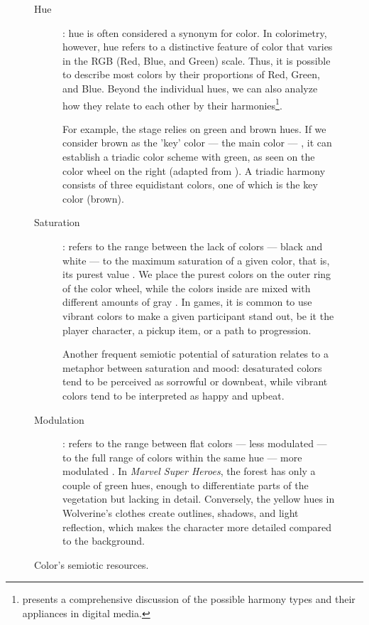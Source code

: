 \documentclass[english]{textolivre}
\begin{document}
\begin{figure}[htbp]
\begin{minipage}[t]{0.47\textwidth}
\label{fig2b}
\end{minipage}
\caption{Color’s semiotic resources.}
\label{chart1}
\begin{minipage}[t]{\textwidth}
\small
\vspace{2ex}
\begin{description}
    \item[Hue]: hue is often considered a synonym for color. In colorimetry, however, hue refers to a distinctive feature of color that varies in the RGB (Red, Blue, and Green) scale. Thus, it is possible to describe most colors by their proportions of Red, Green, and Blue. Beyond the individual hues, we can also analyze how they relate to each other by their harmonies\footnote{\textcite[p. 86-97]{rhyne_applying_2017} presents a comprehensive discussion of the possible harmony types and their appliances in digital media.}.
    
    For example, the stage relies on green and brown hues. If we consider brown as the 'key' color — the main color — \cite[p.~86]{rhyne_applying_2017}, 
    it can establish a triadic color scheme with green, as seen on the color wheel on the right (adapted from \textcite[p.~96]{rhyne_applying_2017}).
    A triadic harmony consists of three equidistant colors, one of which is the key color (brown).

    \item[Saturation]:  refers to the range between the lack of colors — black and white — to the maximum saturation of a given color, that is, its purest value \cites[p.~167]{van_leeuwen_introducing_2005}[p.~61–2]{rhyne_applying_2017}.
    We place the purest colors on the outer ring of the color wheel, while the colors inside are mixed with different amounts of gray \cite[p. 61]{rhyne_applying_2017}. In games, it is common to use vibrant colors to make a given participant stand out, be it the player character, a pickup item, or a path to progression.
    
    Another frequent semiotic potential of saturation relates to a metaphor \cite[p. 30]{van_leeuwen_introducing_2005} between saturation and mood: desaturated colors tend to be perceived as sorrowful or downbeat, while vibrant colors tend to be interpreted as happy and upbeat.

    \item[Modulation]: refers to the range between flat colors — less modulated — to the full range of colors within the same hue — more modulated \cite[p. 167]{van_leeuwen_introducing_2005}. In \textit{Marvel Super Heroes}, the forest has only a couple of green hues, enough to differentiate parts of the vegetation but lacking in detail. Conversely, the yellow hues in Wolverine’s clothes create outlines, shadows, and light reflection, which makes the character more detailed compared to the background.


\end{description}
\end{minipage}
\end{figure}
\end{document}
